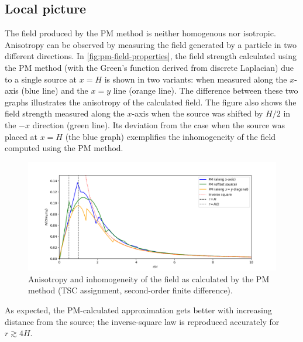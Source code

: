 \subsection{Local picture}
The field produced by the PM method is neither homogenous nor isotropic.
Anisotropy can be observed by measuring the field generated by a particle in two different directions.
In \autoref{fig:pm-field-properties}, the field strength calculated using the PM method (with the Green's function derived from discrete Laplacian) due to a single source at $x = H$ is shown in two variants: when measured along the $x$-axis (blue line) and the $x=y$ line (orange line).
The difference between these two graphs illustrates the anisotropy of the calculated field.
The figure also shows the field strength measured along the $x$-axis when the source was shifted by $H/2$ in the $-x$ direction (green line).
Its deviation from the case when the source was placed at $x=H$ (the blue graph) exemplifies the inhomogeneity of the field computed using the PM method.
\begin{figure}[!ht]
    \centering
    \includegraphics[scale=0.55]{chapters/pm-method/img/pm-field-combined.png}
    \caption{Anisotropy and inhomogeneity of the field as calculated by the PM method (TSC assignment, second-order finite difference).}
    \label{fig:pm-field-properties}
\end{figure}
As expected, the PM-calculated approximation gets better with increasing distance from the source;
the inverse-square law is reproduced accurately for $r \gtrsim 4H$.

